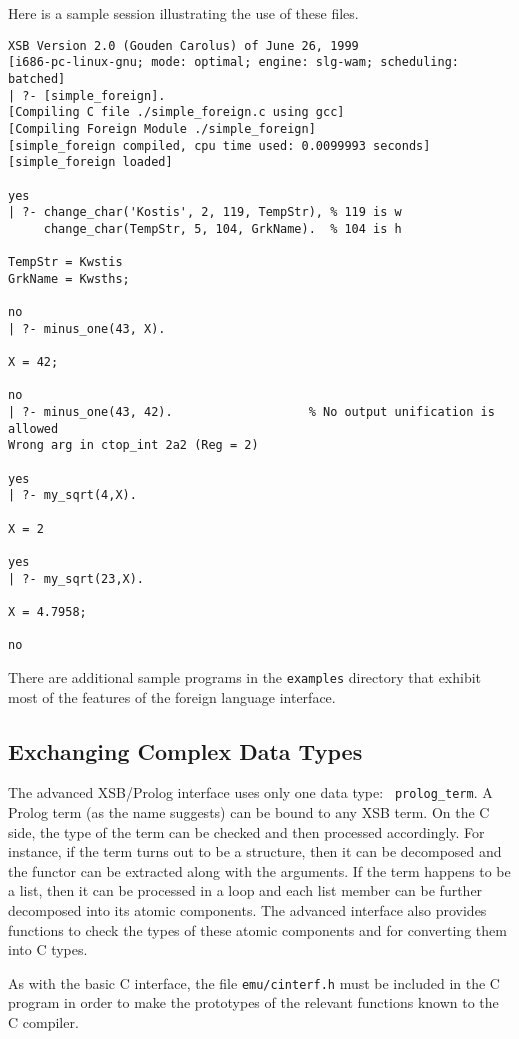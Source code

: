 Here is a sample session illustrating the use of these files.
\begin{small}
\begin{verbatim}
XSB Version 2.0 (Gouden Carolus) of June 26, 1999
[i686-pc-linux-gnu; mode: optimal; engine: slg-wam; scheduling: batched]
| ?- [simple_foreign].
[Compiling C file ./simple_foreign.c using gcc]
[Compiling Foreign Module ./simple_foreign]
[simple_foreign compiled, cpu time used: 0.0099993 seconds]
[simple_foreign loaded]

yes
| ?- change_char('Kostis', 2, 119, TempStr), % 119 is w
     change_char(TempStr, 5, 104, GrkName).  % 104 is h

TempStr = Kwstis
GrkName = Kwsths;

no
| ?- minus_one(43, X).

X = 42;

no
| ?- minus_one(43, 42).                   % No output unification is allowed
Wrong arg in ctop_int 2a2 (Reg = 2)

yes
| ?- my_sqrt(4,X). 

X = 2

yes
| ?- my_sqrt(23,X).

X = 4.7958;

no
\end{verbatim}
\end{small}

There are additional sample programs in the {\tt examples} directory that
exhibit most of the features of the foreign language interface.


\subsection{Exchanging Complex Data Types}
\label{c2p_p2p_p2c}

The advanced XSB/Prolog interface uses only one data type: {\tt
prolog\_term}.  A Prolog term (as the name suggests) can be bound to any
XSB term. On the C side, the type of the term can be checked and then
processed accordingly.
For instance, if the term turns out to be a structure, then it can be
decomposed and the functor can be extracted along with the arguments.
If the term happens to be a list, then it can be processed in a loop and
each list member can be further decomposed into its atomic components.
The advanced interface also provides functions to check the types of these
atomic components and for converting them into C types.

As with the basic C interface, the file {\tt emu/cinterf.h} must be
included in the C program in order to make the prototypes of the relevant
functions known to the C compiler.

